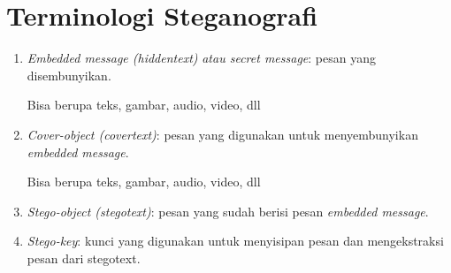 \documentclass{article}
\begin{document}

\section*{Terminologi Steganografi}

\begin{enumerate}
  \item \textit{Embedded message (hiddentext)} \textit{atau secret message}: pesan yang disembunyikan.
  
  Bisa berupa teks, gambar, audio, video, dll
  
  \item \textit{Cover-object (covertext)}: pesan yang digunakan untuk menyembunyikan \textit{embedded message}.
  
  Bisa berupa teks, gambar, audio, video, dll
  
  \item \textit{Stego-object (stegotext)}: pesan yang sudah berisi pesan \textit{embedded message}.
  
  \item \textit{Stego-key}: kunci yang digunakan untuk menyisipan pesan dan mengekstraksi pesan dari stegotext.
\end{enumerate}
\end{document}
